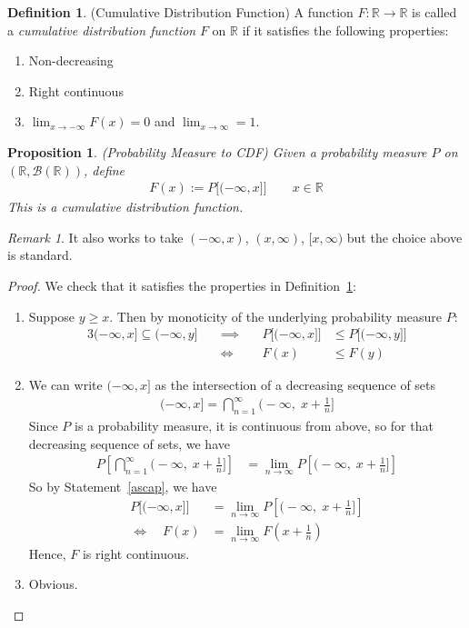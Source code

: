 \documentclass[12pt]{article}
\theoremstyle{plain}
\newtheorem{prop}[thm]{Proposition}
\theoremstyle{definition}
\newtheorem{defn}[thm]{Definition}
\theoremstyle{remark}
\newtheorem*{rmk}{Remark}
\newcommand{\limn}{\lim_{n\rightarrow\infty}}
\newcommand{\ra}{\rightarrow}
\newcommand{\sB}{\mathscr{B}}
\newcommand{\R}{\mathbb{R}}
\newcommand{\ninf}{_{n=1}^\infty}
\begin{document}
\begin{defn}(Cumulative Distribution Function)
\label{defn:cdf}
A function $F:\R\ra\R$ is called a
\emph{cumulative distribution function} $F$ on $\R$ if it satisfies the
following properties:
\begin{enumerate}
  \item Non-decreasing
  \item Right continuous
  \item $\lim_{x\ra-\infty} F(x)=0$ and $\lim_{x\ra \infty}=1$.
\end{enumerate}
\end{defn}


\begin{prop}\emph{(Probability Measure to CDF)}
Given a probability measure $P$ on $(\R,\sB(\R))$, define
\begin{align*}
  F(x) := P\big[(-\infty,x]\big]
  \qquad x\in\R
\end{align*}
This is a cumulative distribution function.
\end{prop}
\begin{rmk}
It also works to take $(-\infty,x)$, $(x,\infty)$, $[x,\infty)$ but the
choice above is standard.
\end{rmk}
\begin{proof}
We check that it satisfies the properties in Definition~\ref{defn:cdf}:
\begin{enumerate}
  \item Suppose $y \geq x$. Then by monoticity of the underlying
    probability measure $P$:
    \begin{alignat*}{3}
      (-\infty,x]\subseteq (-\infty,y]
      &\quad\implies\quad
      &P\big[(-\infty,x]\big]
      &\leq
      P\big[(-\infty,y]\big] \\
      &\quad\iff\quad
      &F(x) &\leq F(y)
    \end{alignat*}

  \item We can write $(-\infty,x]$ as the intersection of a decreasing
    sequence of sets
    \begin{align}
      (-\infty,x] = \bigcap\ninf \bigg(-\infty, \; x+\frac{1}{n}\bigg]
      \label{ascap}
    \end{align}
    Since $P$ is a probability measure, it is continuous from above,
    so for that decreasing sequence of sets, we have
    \begin{align*}
      P\left[ \bigcap\ninf \bigg(-\infty, \; x+\frac{1}{n}\bigg]
      \right]
      &=\limn P\left[ \bigg(-\infty, \; x+\frac{1}{n}\bigg]
      \right]
    \end{align*}
    So by Statement~\ref{ascap}, we have
    \begin{align*}
      P\big[(-\infty,x]\big]
      &=\limn P\left[ \bigg(-\infty, \; x+\frac{1}{n}\bigg]\right] \\
      \iff \quad
      F(x)
      &=\limn F\left(x+\frac{1}{n}\right)
    \end{align*}
    Hence, $F$ is right continuous.

  \item Obvious.
\end{enumerate}
\end{proof}
\end{document}
